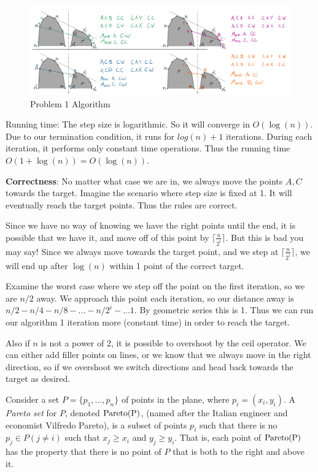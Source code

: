 \documentclass[11pt]{article}
\newcommand{\pareto}[1]{\rm{Pareto}(#1)}
\begin{document}
\begin{figure}[h]
    \centering
    \includegraphics[width=\textwidth]{prob1_alg.png}
    \caption{Problem 1 Algorithm}
    \label{fig:prob1}
\end{figure}

Running time: The step size is logarithmic. So it will converge in $O(\log (n))$.
Due to our termination condition, it runs for $log(n) + 1$ iterations. During each iteration,
it performs only constant time operations. Thus the running time $O(1+ \log(n)) = O(\log(n))$.


\textbf{Correctness}: No matter what case we are in, we always move the points $A,C$ towards the target. 
Imagine the scenario where step size is fixed at 1. It will eventually reach the target points.
Thus the rules are correct.

Since we have no way of knowing we have the right points until the end, it is possible that we have it, and move off of this point by $\lceil \frac{n}{2^i} \rceil$.
But this is bad you may say! Since we always move towards the target point, and we step at $\lceil \frac{n}{2^i} \rceil$,
we will end up after $\log (n)$ within 1 point of the correct target. 

Examine the worst case where we step off the point on the first iteration, so we are $n/2$ away.
We approach this point each iteration, so our distance away is $n/2 - n/4 - n/8 - ... - n/2^i - ... 1$.
By geometric series this is 1. Thus we can run our algorithm 1 iteration more (constant time) in order to reach the target.

Also if $n$ is not a power of 2, it is possible to overshoot by the ceil operator. We can either add filler points on lines,
or we know that we always move in the right direction, so if we overshoot we switch directions and head back towards the target as desired.








Consider a set $P = \{p_1, \ldots, p_n \}$ of points in the plane, where $p_i =
(x_i, y_i)$. A \emph{Pareto set} for $P$, denoted $\pareto{P}$, (named after
the Italian engineer and economist Vilfredo Pareto), is a subset of points
$p_i$ such that there is no $p_j \in P (j \neq i)$ such that $x_j \geq x_i$ and
$y_j \geq y_i$.  That is, each point of $\pareto{P}$ has the property that
there is no point of $P$ that is both to the right and above it.
\end{document}
